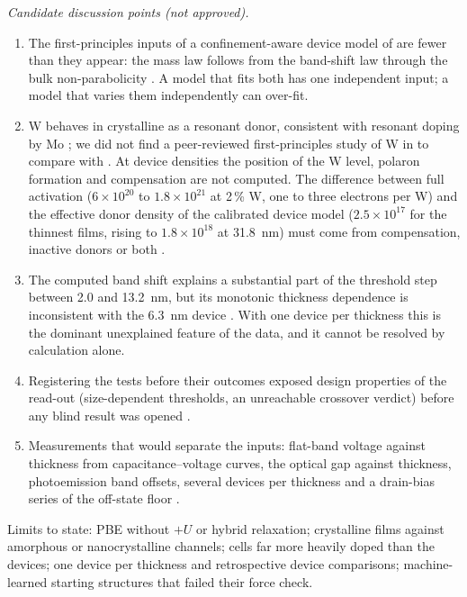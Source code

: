 \documentclass[11pt]{article}
\begin{document}
\textit{Candidate discussion points (not approved).}
\begin{enumerate}
\item The first-principles inputs of a confinement-aware device model of \InO{} are fewer than they appear: the mass law
follows from the band-shift law through the bulk non-parabolicity . A model that fits both has one
independent input; a model that varies them independently can over-fit.
\item W behaves in crystalline \InO{} as a resonant donor, consistent with resonant doping by Mo \citep{Swallow2020}; we
did not find a peer-reviewed first-principles study of W in \InO{} to compare with . At device densities the
position of the W level, polaron formation and compensation are not computed. The difference between full activation
($6\times10^{20}$ to $1.8\times10^{21}$\cmcu{} at 2\,\% W, one to three electrons per W) and the effective donor density of the calibrated device model
($2.5\times10^{17}$\cmcu{} for the thinnest films, rising to $1.8\times10^{18}$\cmcu{} at 31.8~nm) must come from compensation, inactive donors or both .
\item The computed band shift explains a substantial part of the threshold step between 2.0 and 13.2~nm, but its
monotonic thickness dependence is inconsistent with the 6.3~nm device . With one device per thickness this is
the dominant unexplained feature of the data, and it cannot be resolved by calculation alone.
\item Registering the tests before their outcomes exposed design properties of the read-out (size-dependent thresholds,
an unreachable crossover verdict) before any blind result was opened . 
\item Measurements that would separate the inputs: flat-band voltage against thickness from capacitance--voltage curves,
the optical gap against thickness, photoemission band offsets, several devices per thickness and a drain-bias series
of the off-state floor .
\end{enumerate}
\begin{intent}
Limits to state: PBE without $+U$ or hybrid relaxation; crystalline films against amorphous or nanocrystalline channels;
cells far more heavily doped than the devices; one device per thickness and retrospective device comparisons;
machine-learned starting structures that failed their force check.
\end{intent}
\end{document}

